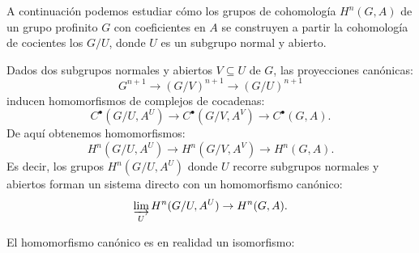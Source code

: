 \documentclass[a4paper,12pt, leqno]{article}
\begin{document}
A continuación podemos estudiar cómo los grupos de cohomología $H^n(G,A)$ de un grupo profinito $G$ con coeficientes en $A$ se construyen a partir la cohomología de cocientes los $G/U$, donde $U$ es un subgrupo normal y abierto.  

Dados dos subgrupos normales y abiertos $V\subseteq U$ de $G$, las proyecciones canónicas:
\begin{equation*}
G^{n+1}\rightarrow (G/V)^{n+1} \rightarrow (G/U)^{n+1}
\end{equation*}
inducen homomorfismos de complejos de cocadenas:
\begin{equation*}
C^{\bullet}(G/U,A^U) \rightarrow C^{\bullet}(G/V,A^V) \rightarrow C^{\bullet}(G,A).
\end{equation*}
De aquí obtenemos homomorfismos:
\begin{equation*}
H^n(G/U,A^U) \rightarrow H^n(G/V,A^V)\rightarrow H^n(G,A).
\end{equation*}
Es decir, los grupos $H^n(G/U,A^U)$ donde $U$ recorre subgrupos normales y abiertos forman un sistema directo con un homomorfismo canónico:
\begin{equation*}
\varinjlim\limits_{U} H^n(G/U,A^U) \rightarrow H^n(G,A).
\end{equation*}
\begin{prop}\label{prop3}
El homomorfismo canónico es en realidad un isomorfismo:
\begin{center}
\end{center}
\end{prop}
\end{document}
